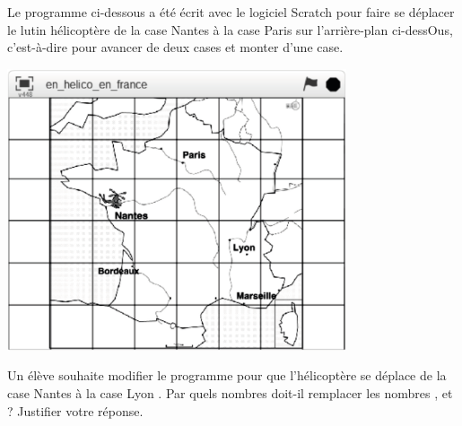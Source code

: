 \begin{exercice}[CRPE 2018 G2] %
   Le programme ci-dessous a été écrit avec le logiciel Scratch pour faire se déplacer le lutin \og hélicoptère \fg{} de la case \og Nantes \fg{} à la case \og Paris \fg{} sur l’arrière-plan ci-dessOus, c’est-à-dire pour \og avancer \fg{} de deux cases et \og monter \fg{} d’une case.
   \begin{center}
      \includegraphics[width=10cm]{Transversal/Images/T15_ex_carte}
   \end{center}
   Un élève souhaite modifier le programme pour que l’hélicoptère se déplace de la case \og Nantes \fg{} à la case \og Lyon \fg{}. Par quels nombres doit-il remplacer les nombres  \fg{},  \fg{} et  \fg{} ? Justifier votre réponse.
   \begin{center}
      \begin{scratch}
      \end{scratch}
      \qquad
      \begin{scratch}
      \end{scratch}
      \qquad
      \begin{scratch}
      \end{scratch}
   \end{center}
\end{exercice}


